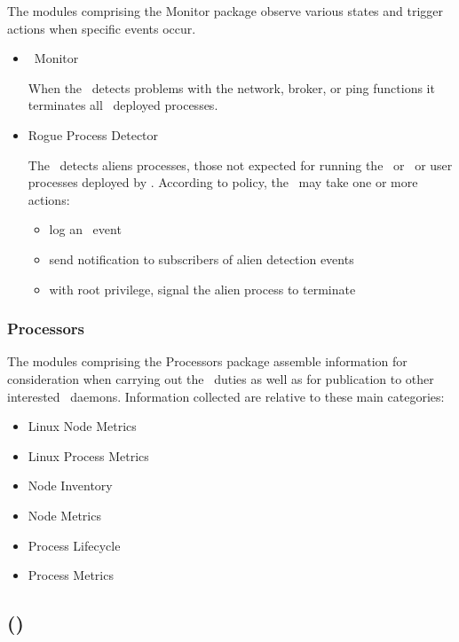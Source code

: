\begin{itemize}
    The modules comprising the Monitor package observe various states and
    trigger actions when specific events occur.
        
    \begin{itemize}
      \item \varAgent~Monitor
      
      When the \varAgent~detects problems with the network, broker, or ping
      functions it terminates all \varAgent~deployed processes.
       
      \item Rogue Process Detector
      
      The \varAgent~detects aliens processes, those not expected for running
      the \varOS~or \varDUCC~or user processes deployed by \varDUCC.
      According to policy, the \varAgent~may take one or more actions:
      \begin{itemize}
        \item log an \varAlienDetected~event
        \item send notification to subscribers of alien detection events
        \item with root privilege, signal the alien process to terminate
      \end{itemize} 
      
    \end{itemize}   
    
    \subsubsection{Processors} 
    
    The modules comprising the Processors package assemble information for
    consideration when carrying out the \varAgent~duties as well as for publication
    to other interested \varDUCC~daemons.  Information collected are relative to
    these main categories:
    
    \begin{itemize}
      \item Linux Node Metrics
      \item Linux Process Metrics
      \item Node Inventory
      \item Node Metrics
      \item Process Lifecycle
      \item Process Metrics
    \end{itemize}   

    \subsection{\varJobDriver (\varJD)}    


\end{itemize}
